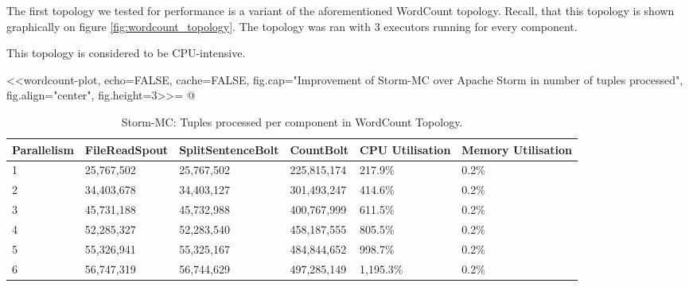 The first topology we tested for performance is a variant of the aforementioned WordCount topology. Recall, that this topology is shown graphically on figure \ref{fig:wordcount_topology}. The topology was ran with 3 executors running for every component.

This topology is considered to be CPU-intensive.

<<wordcount-plot, echo=FALSE, cache=FALSE, fig.cap="Improvement of Storm-MC over Apache Storm in number of tuples processed", fig.align="center", fig.height=3>>=
@

\medskip
\begin{table}
\begin{adjustwidth}{-0.5in}{-0.5in}
\centering
\small
\begin{tabular}{@{}llllll@{}}
    {Parallelism} & {FileReadSpout} & {SplitSentenceBolt} & {CountBolt} & {CPU Utilisation} & {Memory Utilisation} \\ \toprule
    1 & {25,767,502} & {25,767,502} & {225,815,174} & {217.9\%} & {0.2\%} \\
    2 & {34,403,678} & {34,403,127} & {301,493,247} & {414.6\%} & {0.2\%} \\
    3 & {45,731,188} & {45,732,988} & {400,767,999} & {611.5\%} & {0.2\%} \\
    4 & {52,285,327} & {52,283,540} & {458,187,555} & {805.5\%} & {0.2\%} \\
	5 & {55,326,941} & {55,325,167} & {484,844,652} & {998.7\%} & {0.2\%} \\
	6 & {56,747,319} & {56,744,629} & {497,285,149} & {1,195.3\%} & {0.2\%} \\
\end{tabular}
\caption{Storm-MC: Tuples processed per component in WordCount Topology.}
\end{adjustwidth}
\label{table:wordcount}
\end{table}
\medskip

